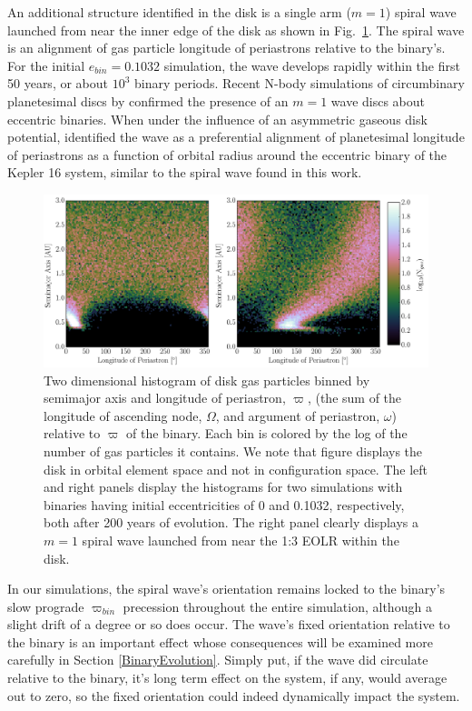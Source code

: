 An additional structure identified in the disk is a single arm ($m = 1$) spiral wave launched from near the inner edge of the disk as shown
in Fig.~\ref{fig:figure5}.  The spiral wave is an alignment of gas particle longitude of periastrons relative to the binary's.  For the initial $e_{bin} = 0.1032$ simulation, the wave develops rapidly within the first 50 years, or about $10^3$ binary periods.  Recent N-body simulations of circumbinary planetesimal discs by \citet{Lines16} confirmed the presence of an $m = 1$ wave discs about eccentric binaries.  When under the influence of an asymmetric gaseous disk potential, \citet{Lines16} identified the wave as a preferential alignment of planetesimal longitude of periastrons as a function of orbital radius around the eccentric binary of the Kepler 16 system, similar to the spiral wave found in this work.

\begin{figure}
	\includegraphics[width=\textwidth]{f5}
    \caption{Two dimensional histogram of disk gas particles binned by semimajor axis and
longitude of periastron, $\varpi$, (the sum of the longitude of ascending node, $\Omega$, and argument of periastron, $\omega$)
relative to $\varpi$ of the binary.  Each bin is colored by the log of the number of gas particles it contains.  We note that figure displays the disk in orbital element 
space and not in configuration space.  The left and right panels display the histograms for two simulations with binaries having initial eccentricities of 0 and 
0.1032, respectively, both after 200 years of evolution.  The right panel clearly displays a $m = 1$ spiral wave launched from near the 1:3 EOLR within the disk.}
    \label{fig:figure5}
\end{figure}

In our simulations, the spiral wave's orientation remains locked to
the binary's slow prograde $\varpi_{bin}$ precession throughout the
entire simulation, although a slight drift of a degree or so does
occur.  The wave's fixed orientation relative to the binary is an
important effect whose consequences will be examined more carefully in
Section \ref{BinaryEvolution}.  Simply put, if the wave did circulate
relative to the binary, it's long term effect on the system, if any,
would average out to zero, so the fixed orientation could indeed dynamically impact the system.

